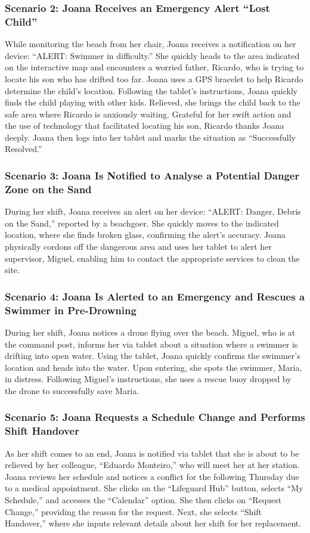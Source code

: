 \subsubsection{\textbf{Scenario 2:} Joana Receives an Emergency Alert ``Lost Child''}
While monitoring the beach from her chair, Joana receives a notification on her device: ``ALERT: Swimmer in difficulty.'' She quickly heads to the area indicated on the interactive map and encounters a worried father, Ricardo, who is trying to locate his son who has drifted too far. Joana uses a GPS bracelet to help Ricardo determine the child's location. Following the tablet's instructions, Joana quickly finds the child playing with other kids. Relieved, she brings the child back to the safe area where Ricardo is anxiously waiting. Grateful for her swift action and the use of technology that facilitated locating his son, Ricardo thanks Joana deeply. Joana then logs into her tablet and marks the situation as ``Successfully Resolved.''
\subsubsection{\textbf{Scenario 3:} Joana Is Notified to Analyse a Potential Danger Zone on the Sand}
During her shift, Joana receives an alert on her device: ``ALERT: Danger, Debris on the Sand,'' reported by a beachgoer. She quickly moves to the indicated location, where she finds broken glass, confirming the alert's accuracy. Joana physically cordons off the dangerous area and uses her tablet to alert her supervisor, Miguel, enabling him to contact the appropriate services to clean the site.
\subsubsection{\textbf{Scenario 4:} Joana Is Alerted to an Emergency and Rescues a Swimmer in Pre-Drowning}
During her shift, Joana notices a drone flying over the beach. Miguel, who is at the command post, informs her via tablet about a situation where a swimmer is drifting into open water. Using the tablet, Joana quickly confirms the swimmer's location and heads into the water. Upon entering, she spots the swimmer, Maria, in distress. Following Miguel's instructions, she uses a rescue buoy dropped by the drone to successfully save Maria.
\subsubsection{\textbf{Scenario 5:} Joana Requests a Schedule Change and Performs Shift Handover}
As her shift comes to an end, Joana is notified via tablet that she is about to be relieved by her colleague, ``Eduardo Monteiro,'' who will meet her at her station. Joana reviews her schedule and notices a conflict for the following Thursday due to a medical appointment. She clicks on the ``Lifeguard Hub'' button, selects ``My Schedule,'' and accesses the ``Calendar'' option. She then clicks on ``Request Change,'' providing the reason for the request. Next, she selects ``Shift Handover,'' where she inputs relevant details about her shift for her replacement.
